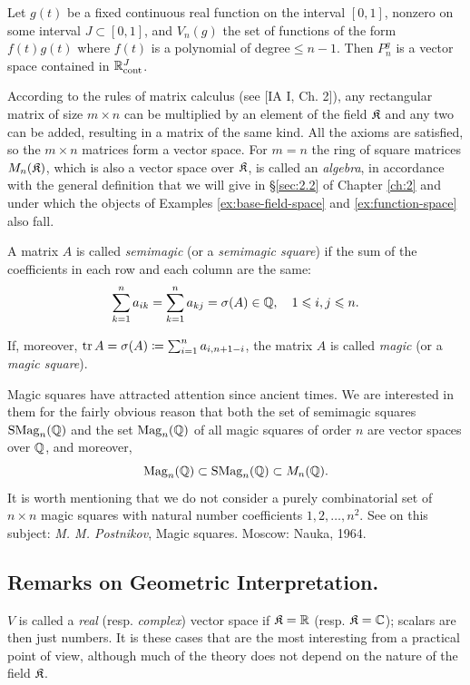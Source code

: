 \begin{example}
	Let $g(t)$ be a fixed continuous real function on the interval $[0,1]$, nonzero on some interval $J\subset [0,1]$, and $V_n (g)$ the set of functions of the form $f(t)g(t)$ where $f(t)$ is a polynomial of degree$\le n-1$. Then $P_n^g$ is a vector space contained in ${\mathbb{R}}_{\mathrm{cont}}^J$.
\end{example}

\begin{example}
	According to the rules of matrix calculus (see [IA I, Ch. 2]), any rectangular matrix of size $m\times n$ can be multiplied by an element of the field ${\mathfrak{K}}$ and any two can be added, resulting in a matrix of the same kind. All the axioms are satisfied, so the $m\times n$ matrices form a vector space. For $m = n$ the ring of square matrices $M_n ({\mathfrak{K}})$, which is also a vector space over ${\mathfrak{K}}$, is called an \textit{algebra}, in accordance with the general definition that we will give in \S\ref{sec:2.2} of Chapter \ref{ch:2} and under which the objects of Examples \ref{ex:base-field-space} and \ref{ex:function-space} also fall.
\end{example}

\begin{example}
	A matrix $A$ is called \textit{semimagic} (or a \textit{semimagic square}) if the sum of the coefficients in each row and each column are the same:
	\[\sum_{k=1}^n a_{ik} = \sum_{k=1}^na_{kj} = \sigma (A)\in {\mathbb{Q}},\quad 1\leqslant i,j \leqslant n.\]
	
	If, moreover, $\operatorname{tr} A=\sigma (A)\coloneqq \sum_{i=1}^n a_{i,n+1-i}$, the matrix $A$ is called \textit{magic} (or a \textit{magic square}).

	Magic squares have attracted attention since ancient times. We are interested in them for the fairly obvious reason that both the set of semimagic squares $\mathrm{SMag}_n ({\mathbb{Q}})$ and the set $\mathrm{Mag}_n ({\mathbb{Q}})$ of all magic squares of order $n$ are vector spaces over ${\mathbb{Q}}$, and moreover, 
	\[\mathrm{Mag}_n({\mathbb{Q}}) \subset \mathrm{SMag}_n({\mathbb{Q}}) \subset M_n({\mathbb{Q}}).\]
	It is worth mentioning that we do not consider a purely combinatorial set of $n\times n$ magic squares with natural number coefficients $1, 2, \dots , n^2$. See on this subject: \textit{M. M. Postnikov}, Magic squares. Moscow: Nauka, 1964.
\end{example}
\subsection{Remarks on Geometric Interpretation.}
$V$ is called a \textit{real} (resp. \textit{complex}) vector space if ${\mathfrak{K}} ={\mathbb{R}}$ (resp. ${\mathfrak{K}} ={\mathbb{C}}$); scalars are then just numbers. It is these cases that are the most interesting from a practical point of view, although much of the theory does not depend on the nature of the field ${\mathfrak{K}}$.

